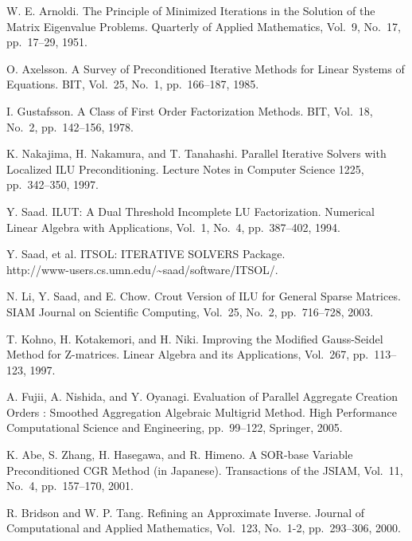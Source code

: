 \documentclass[a4paper]{jarticle}
\begin{document}
{\begin{thebibliography}{10}
W. E. Arnoldi.
\newblock The Principle of Minimized Iterations in the Solution of the Matrix Eigenvalue Problems.
\newblock Quarterly of Applied Mathematics, Vol.~9, No.~17, pp.\ 17--29, 1951.

O. Axelsson.
\newblock A Survey of Preconditioned Iterative Methods for Linear
	Systems of Equations.
\newblock BIT, Vol.~25, No.~1, pp.\ 166--187, 1985.

I. Gustafsson.
\newblock A Class of First Order Factorization Methods.
\newblock BIT, Vol.~18, No.~2, pp.\ 142--156, 1978.

K. Nakajima, H. Nakamura, and T. Tanahashi.
\newblock Parallel Iterative Solvers with Localized ILU Preconditioning.
\newblock Lecture Notes in Computer Science 1225, pp.\ 342--350, 1997.

Y. Saad.
\newblock ILUT: A Dual Threshold Incomplete LU Factorization.
\newblock Numerical Linear Algebra with Applications, Vol.~1, No.~4, pp.\ 387--402, 1994. 

Y. Saad, et al.
\newblock ITSOL: ITERATIVE SOLVERS Package. \\
\newblock http://www-users.cs.umn.edu/\textasciitilde saad/software/ITSOL/.

N. Li, Y. Saad, and E. Chow.
\newblock Crout Version of ILU for General Sparse Matrices.
\newblock SIAM Journal on Scientific Computing, Vol.~25, No.~2, pp.\ 716--728, 2003. 

T. Kohno, H. Kotakemori, and H. Niki.
\newblock Improving the Modified Gauss-Seidel Method for Z-matrices.
\newblock Linear Algebra and its Applications, Vol.~267, pp.\ 113--123, 1997.

A. Fujii, A. Nishida, and Y. Oyanagi.
\newblock Evaluation of Parallel Aggregate Creation Orders : Smoothed Aggregation Algebraic Multigrid Method.
\newblock High Performance Computational Science and Engineering, pp.\ 99--122, Springer, 2005. 

K. Abe, S. Zhang, H. Hasegawa, and R. Himeno.
\newblock A SOR-base Variable Preconditioned CGR Method (in Japanese).
\newblock Transactions of the JSIAM,  Vol.~11, No.~4, pp.\ 157--170, 2001.

R. Bridson and W. P. Tang.
\newblock Refining an Approximate Inverse.
\newblock Journal of Computational and Applied Mathematics, Vol.~123, No.~1-2, pp.\ 293--306, 2000. 


\end{thebibliography}}
\end{document}
